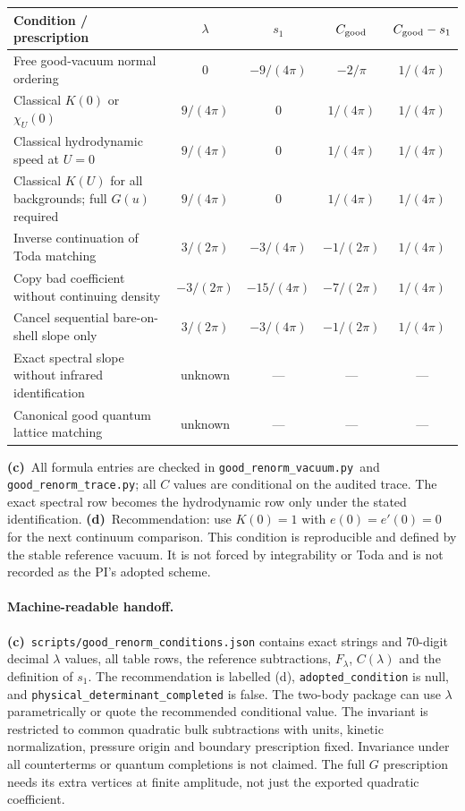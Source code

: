 \documentclass[11pt,a4paper]{article}
\newcommand{\C}{\textbf{(c)}\ }
\newcommand{\D}{\textbf{(d)}\ }
\newcommand{\file}[1]{\nolinkurl{#1}}
\newcommand{\vac}{\file{good_renorm_vacuum.py}}
\newcommand{\trc}{\file{good_renorm_trace.py}}
\begin{document}
\begin{center}\small
\begin{tabular}{@{}L{5.3cm}cccc@{}}\toprule
Condition / prescription & $\lambda$ & $s_1$ & $C_{\rm good}$ & $C_{\rm good}-s_1$\\\midrule
Free good-vacuum normal ordering & $0$ & $-9/(4\pi)$ & $-2/\pi$ & $1/(4\pi)$\\[3pt]
Classical $K(0)$ or $\chi_U(0)$ & $9/(4\pi)$ & $0$ & $1/(4\pi)$ & $1/(4\pi)$\\[3pt]
Classical hydrodynamic speed at $U=0$ & $9/(4\pi)$ & $0$ & $1/(4\pi)$ & $1/(4\pi)$\\[3pt]
Classical $K(U)$ for all backgrounds; full $G(u)$ required & $9/(4\pi)$\footnotemark & $0$ & $1/(4\pi)$ & $1/(4\pi)$\\[3pt]
Inverse continuation of Toda matching & $3/(2\pi)$ & $-3/(4\pi)$ & $-1/(2\pi)$ & $1/(4\pi)$\\[3pt]
Copy bad coefficient without continuing density & $-3/(2\pi)$ & $-15/(4\pi)$ & $-7/(2\pi)$ & $1/(4\pi)$\\[3pt]
Cancel sequential bare-on-shell slope only & $3/(2\pi)$ & $-3/(4\pi)$ & $-1/(2\pi)$ & $1/(4\pi)$\\[3pt]
Exact spectral slope without infrared identification & unknown & --- & --- & ---\\[3pt]
Canonical good quantum lattice matching & unknown & --- & --- & ---\\\bottomrule
\end{tabular}
\end{center}
\C All formula entries are checked in \vac\ and \trc; all $C$ values
are conditional on the audited trace. The exact spectral row becomes the
hydrodynamic row only under the stated identification.
\D Recommendation: use $K(0)=1$ with $e(0)=e'(0)=0$ for the next
continuum comparison. This condition is reproducible and defined by the
stable reference vacuum. It is not forced by integrability or Toda and is
not recorded as the PI's adopted scheme.

\paragraph{Machine-readable handoff.}
\C \file{scripts/good_renorm_conditions.json} contains exact strings and
70-digit decimal $\lambda$ values, all table rows, the reference
subtractions, $F_\lambda$, $C(\lambda)$ and the definition of $s_1$.
The recommendation is labelled (d), \file{adopted_condition} is null,
and \file{physical_determinant_completed} is false. The two-body package
can use $\lambda$ parametrically or quote the recommended conditional value.
The invariant is restricted to common quadratic bulk subtractions with
units, kinetic normalization, pressure origin and boundary prescription
fixed. Invariance under all counterterms or quantum completions is not
claimed. The full $G$ prescription needs its extra vertices at finite
amplitude, not just the exported quadratic coefficient.
\end{document}
